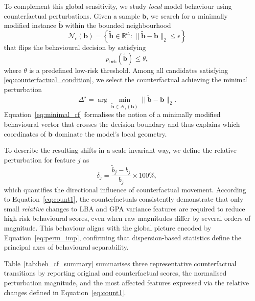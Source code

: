 \documentclass[3p]{elsarticle}
\begin{document}
To complement this global sensitivity, we study \emph{local} model behaviour using counterfactual perturbations. Given a sample $\mathbf{b}$, we search for a minimally modified instance $\tilde{\mathbf{b}}$ within the bounded neighbourhood
\begin{equation}
\mathcal{N}_{\epsilon}(\mathbf{b}) = \left\{\tilde{\mathbf{b}} \in \mathbb{R}^{d_b} : 
\|\tilde{\mathbf{b}} - \mathbf{b}\|_2 \le \epsilon \right\}
\label{eq:neighbourhood}
\end{equation}
that flips the behavioural decision by satisfying
\begin{equation}
p_{\mathrm{beh}}(\tilde{\mathbf{b}}) \le \theta ,
\label{eq:counterfactual_condition}
\end{equation}
where $\theta$ is a predefined low-risk threshold. Among all candidates satisfying \eqref{eq:counterfactual_condition}, we select the counterfactual achieving the minimal perturbation
\begin{equation}
\Delta^\star
=
\arg\min_{\tilde{\mathbf{b}} \in \mathcal{N}_{\epsilon}(\mathbf{b})}
\|\tilde{\mathbf{b}} - \mathbf{b}\|_2 .
\label{eq:minimal_cf}
\end{equation}
Equation~\eqref{eq:minimal_cf} formalises the notion of a minimally modified behavioural vector that crosses the decision boundary and thus explains which coordinates of $\mathbf{b}$ dominate the model's local geometry.

To describe the resulting shifts in a scale-invariant way, we define the relative perturbation for feature $j$ as
\begin{equation}
\delta_j
=
\frac{\tilde{b}_j - b_j}{b_j}\times 100\% ,
\label{eq:count1}
\end{equation}
which quantifies the directional influence of counterfactual movement. According to Equation~\eqref{eq:count1}, the counterfactuals consistently demonstrate that only small \emph{relative} changes to LBA and GPA variance features are required to reduce high-risk behavioural scores, even when raw magnitudes differ by several orders of magnitude. This behaviour aligns with the global picture encoded by Equation~\eqref{eq:perm_imp}, confirming that dispersion-based statistics define the principal axes of behavioural separability.

Table~\ref{tab:beh_cf_summary} summarises three representative counterfactual transitions by reporting original and counterfactual scores, the normalised perturbation magnitude, and the most affected features expressed via the relative changes defined in Equation~\eqref{eq:count1}.
\end{document}
